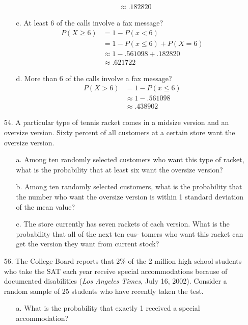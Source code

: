 \documentclass[letterpaper,12pt]{article}
\begin{document}
\begin{enumerate}
\begin{enumerate}
\begin{align*}
          &\approx .182820
        \end{align*}
      \item[c.]
        At least 6 of the calls involve a fax message?
        \begin{align*}
          P(X \ge 6) &= 1 - P(x < 6) \\
          &= 1 - P(x \le 6) + P(X = 6) \\
          &\approx 1 - .561098 + .182820 \\
          &\approx .621722
        \end{align*}
      \item[d.]
        More than 6 of the calls involve a fax message?
        \begin{align*}
          P(X > 6) &= 1 - P(x \le 6) \\
          &\approx 1 - .561098 \\
          &\approx  .438902
        \end{align*}
    \end{enumerate}
  \item[54.]
    A particular type of tennis racket comes in a midsize version and an oversize version. Sixty percent of all customers at a certain store want the oversize version.
    \begin{enumerate}
      \item[a.]
        Among ten randomly selected customers who want this type of racket, what is the probability that at least six want the oversize version?
      \item[b.]
        Among ten randomly selected customers, what is the probability that the number who want the oversize version is within 1 standard deviation of the mean value?
      \item[c.]
        The store currently has seven rackets of each version. What is the probability that all of the next ten cus- tomers who want this racket can get the version they want from current stock?
    \end{enumerate}
  \item[56.]
    The College Board reports that 2\% of the 2 million high school students who take the SAT each year receive special accommodations because of documented disabilities (\textit{Los Angeles Times}, July 16, 2002). Consider a random sample of 25 students who have recently taken the test.
    \begin{enumerate}
      \item[a.]
        What is the probability that exactly 1 received a special accommodation?

\end{enumerate}
\end{enumerate}
\end{document}
